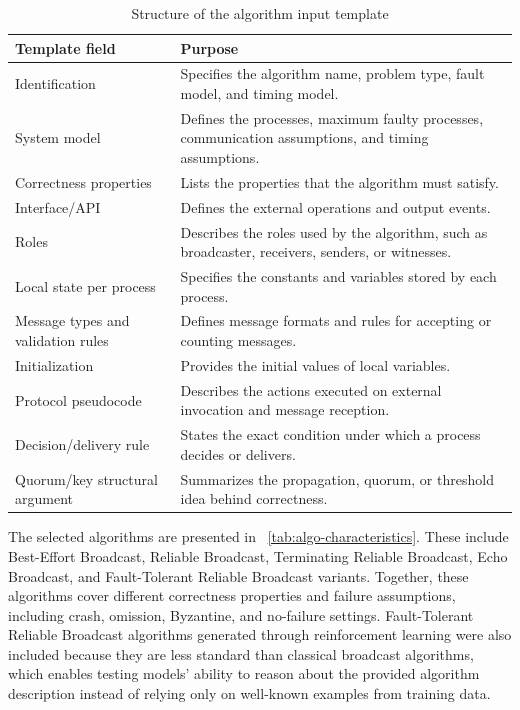 \begin{table}[H]
\centering
\renewcommand{\arraystretch}{1.25}
\caption{Structure of the algorithm input template}
\label{tab:algorithm-template-structure}
\begin{tabular}{|>{\raggedright\arraybackslash}p{4.2cm}|
                >{\raggedright\arraybackslash}p{9cm}|}
\hline
\textbf{Template field} & \textbf{Purpose} \\
\hline
Identification & Specifies the algorithm name, problem type, fault model, and timing model. \\
\hline
System model & Defines the processes, maximum faulty processes, communication assumptions, and timing assumptions. \\
\hline
Correctness properties & Lists the properties that the algorithm must satisfy. \\
\hline
Interface/API & Defines the external operations and output events. \\
\hline
Roles & Describes the roles used by the algorithm, such as broadcaster, receivers, senders, or witnesses. \\
\hline
Local state per process & Specifies the constants and variables stored by each process. \\
\hline
Message types and validation rules & Defines message formats and rules for accepting or counting messages. \\
\hline
Initialization & Provides the initial values of local variables. \\
\hline
Protocol pseudocode & Describes the actions executed on external invocation and message reception. \\
\hline
Decision/delivery rule & States the exact condition under which a process decides or delivers. \\
\hline
Quorum/key structural argument & Summarizes the propagation, quorum, or threshold idea behind correctness. \\
\hline
\end{tabular}
\end{table}

The selected algorithms are presented in ~\ref{tab:algo-characteristics}. These include Best-Effort Broadcast, Reliable Broadcast, Terminating Reliable Broadcast, Echo Broadcast, and Fault-Tolerant Reliable Broadcast variants. Together, these algorithms cover different correctness properties and failure assumptions, including crash, omission, Byzantine, and no-failure settings. Fault-Tolerant Reliable Broadcast algorithms generated through reinforcement learning were also included because they are less standard than classical broadcast algorithms, which enables testing models' ability to reason about the provided algorithm description instead of relying only on well-known examples from training data.

